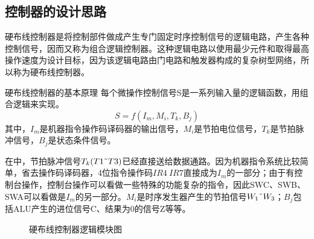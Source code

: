 \subsection{控制器的设计思路}
硬布线控制器是将控制部件做成产生专门固定时序控制信号的逻辑电路，产生各种控制信号，因而又称为组合逻辑控制器。这种逻辑电路以使用最少元件和取得最高操作速度为设计目标，因为该逻辑电路由门电路和触发器构成的复杂树型网络，所以称为硬布线控制器。
\par{硬布线控制器的基本原理}
每个微操作控制信号S是一系列输入量的逻辑函数，用组合逻辑来实现。
\begin{equation}
    S=f(I_m,M_i,T_k,B_j)
\end{equation}
其中，$I_m$是机器指令操作码译码器的输出信号，$M_i$是节拍电位信号，$T_k$是节拍脉冲信号，$B_j$是状态条件信号。
\par
在\tec 中，节拍脉冲信号$T_k(T1\wave T3)$已经直接送给数据通路。因为机器指令系统比较简单，省去操作码译码器，4位指令操作码$IR4~IR7$直接成为$I_m$的一部分；由于\tec 有控制台操作，控制台操作可以看做一些特殊的功能复杂的指令，因此SWC、SWB、SWA可以看做是$I_m$的另一部分。$M_i$是时序发生器产生的节拍信号$W_1\wave W_3$；$B_j$包括ALU产生的进位信号C、结果为0的信号Z等等。
\begin{figure}[htbp]
    \label{硬布线控制器逻辑模块图}
    \caption{硬布线控制器逻辑模块图}
\end{figure}